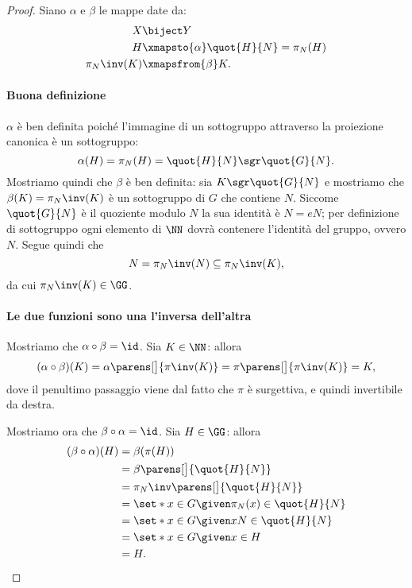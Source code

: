 \begin{proof}
    Siano $\alpha$ e $\beta$ le mappe date da:
    \begin{align*}
        X &\biject Y\\
        H &\xmapsto{\alpha} \quot{H}{N} = \pi_N(H)\\
        \pi_N\inv(K) &\xmapsfrom{\beta} K.
    \end{align*}

    \paragraph{Buona definizione} $\alpha$ è ben definita poiché l'immagine di un sottogruppo attraverso la proiezione canonica è un sottogruppo: \[
        \alpha(H) = \pi_N(H) = \quot{H}{N} \sgr \quot{G}{N}.    
    \] Mostriamo quindi che $\beta$ è ben definita: sia $K \sgr \quot{G}{N}$ e mostriamo che $\beta(K) = \pi_N\inv(K)$ è un sottogruppo di $G$ che contiene $N$. Siccome $\quot{G}{N}$ è il quoziente modulo $N$ la sua identità è $N = eN$; per definizione di sottogruppo ogni elemento di $\NN$ dovrà contenere l'identità del gruppo, ovvero $N$. Segue quindi che \[
        N = \pi_N\inv(N) \subseteq \pi_N\inv(K),
    \] da cui $\pi_N\inv(K) \in \GG$.

    \paragraph{Le due funzioni sono una l'inversa dell'altra} Mostriamo che $\alpha \circ \beta = \id$. Sia $K \in \NN$: allora \[
        (\alpha \circ \beta)(K) = \alpha\parens[\big]{\pi\inv(K)} = \pi\parens[\big]{\pi\inv(K)} = K,
    \] dove il penultimo passaggio viene dal fatto che $\pi$ è surgettiva, e quindi invertibile da destra.

    Mostriamo ora che $\beta \circ \alpha = \id$. Sia $H \in \GG$: allora
    \begin{align*}
           (\beta \circ \alpha)(H) 
        &= \beta(\pi(H))\\
        &= \beta\parens[\big]{\quot{H}{N}} \\
        &= \pi_N\inv\parens[\big]{\quot{H}{N}}\\
        &= \set*{x \in G \given \pi_N(x) \in \quot{H}{N}}\\
        &= \set*{x \in G \given xN \in \quot{H}{N}}\\
        &= \set*{x \in G \given x \in H}\\
        &= H.
    \end{align*}


\end{proof}
